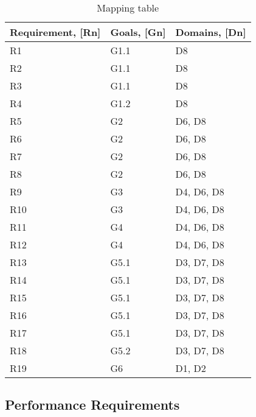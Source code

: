 \newpage
\begin{table}[]
\centering
\begin{tabular}{|
>{\columncolor[HTML]{EFEFEF}}l |l|l|}
\hline
\cellcolor[HTML]{C0C0C0}\textbf{Requirement, {[}Rn{]}} & \cellcolor[HTML]{C0C0C0}\textbf{Goals, {[}Gn{]}} & \cellcolor[HTML]{C0C0C0}\textbf{Domains, {[}Dn{]}} \\ \hline
R1  & G1.1 & D8         \\ \hline
R2  & G1.1 & D8         \\ \hline
R3  & G1.1 & D8         \\ \hline
R4  & G1.2 & D8         \\ \hline
R5  & G2   & D6, D8     \\ \hline
R6  & G2   & D6, D8     \\ \hline
R7  & G2   & D6, D8     \\ \hline
R8  & G2   & D6, D8     \\ \hline
R9  & G3   & D4, D6, D8 \\ \hline
R10 & G3   & D4, D6, D8 \\ \hline
R11 & G4   & D4, D6, D8 \\ \hline
R12 & G4   & D4, D6, D8 \\ \hline
R13 & G5.1 & D3, D7, D8 \\ \hline
R14 & G5.1 & D3, D7, D8 \\ \hline
R15 & G5.1 & D3, D7, D8 \\ \hline
R16 & G5.1 & D3, D7, D8 \\ \hline
R17 & G5.1 & D3, D7, D8 \\ \hline
R18 & G5.2 & D3, D7, D8 \\ \hline
R19 & G6   & D1, D2     \\ \hline
\end{tabular}
\caption{Mapping table}
\label{tab:my-table}
\end{table}
\subsection{Performance Requirements}

